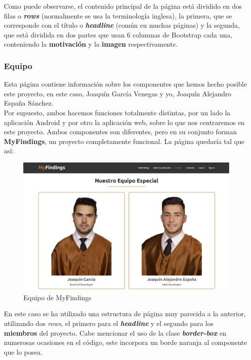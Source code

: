     \newpage Como puede observarse, el contenido principal de la página está dividido en dos filas
    o \textbf{\textit{rows}} (normalmente se usa la terminología inglesa), la primera, que
    se corresponde con el título o \textbf{\textit{headline}} (común en muchas páginas) y la
    segunda, que está dividida en dos partes que usan 6 columnas de Bootstrap cada una,
    conteniendo la \textbf{motivación} y la \textbf{imagen} respectivamente.

    \subsubsection{Equipo}
    Esta página contiene información sobre los componentes que hemos hecho posible este
    proyecto, en este caso, Joaquín García Venegas y yo, Joaquín Alejandro España Sánchez.\\
    
    Por supuesto, ambos hacemos funciones totalmente distintas, por un lado la aplicación
    Android y por otro la aplicación web, sobre lo que nos centraremos en este proyecto.
    Ambos componentes son diferentes, pero en su conjunto forman \textbf{MyFindings},
    un proyecto completamente funcional. La página quedaría tal que así:

        \begin{figure}[H]
            \centering
            \includegraphics[scale=0.23]{imagenes/team.png}
            \caption{Equipo de MyFindings}
            \label{fig:team}
        \end{figure}

    En este caso se ha utilizado una estructura de página muy parecida a la anterior, utilizando
    dos \textit{rows}, el primero para el \textbf{\textit{headline}} y el segundo para los
    \textbf{miembros} del proyecto. Cabe mencionar el uso de la clase \textbf{\textit{border-box}}
    en numerosas ocasiones en el código, este incorpora un borde naranja al componente que lo posea.

